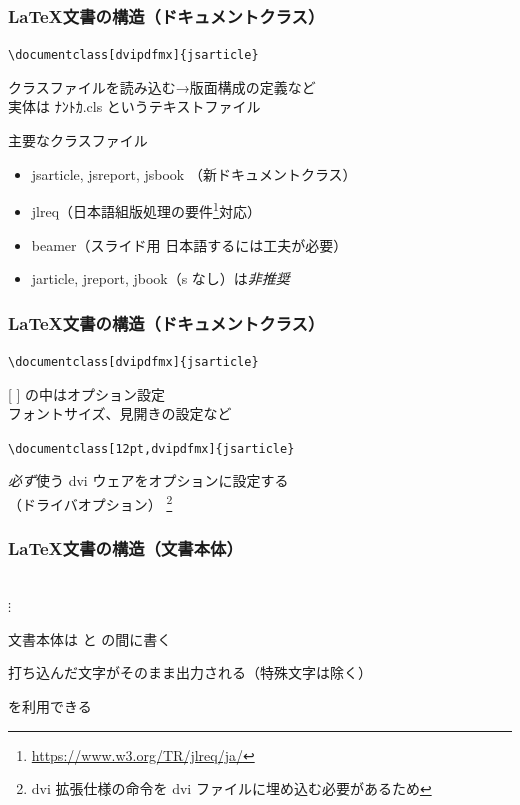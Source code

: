 \begin{frame}[fragile]
	\frametitle{\LaTeX 文書の構造（ドキュメントクラス）}
	\begin{center}
		\verb+\documentclass[dvipdfmx]{jsarticle}+
	\end{center}
	
	クラスファイルを読み込む→版面構成の定義など\\
	{\footnotesize 実体は ﾅﾝﾄｶ.cls というテキストファイル}
	
	\begin{block}{主要なクラスファイル}
		\begin{itemize}
			\footnotesize
			\item jsarticle, jsreport, jsbook （新ドキュメントクラス）\\
			\item jlreq（日本語組版処理の要件\footnote{\url{https://www.w3.org/TR/jlreq/ja/}}対応）\\
			\item beamer（スライド用 日本語するには工夫が必要）
			\item jarticle, jreport, jbook（s なし）は\emph{非推奨}
		\end{itemize}
	\end{block}
\end{frame}

\begin{frame}[fragile]
	\frametitle{\LaTeX 文書の構造（ドキュメントクラス）}
	\begin{center}
		\verb+\documentclass[dvipdfmx]{jsarticle}+
	\end{center}
	
	[ ] の中はオプション設定\\
	\bgroup\footnotesize フォントサイズ、見開きの設定など
	\begin{center}
		\verb+\documentclass[12pt,dvipdfmx]{jsarticle}+
	\end{center}
	\egroup
	
	\emph{必ず}使う dvi ウェアをオプションに設定する\\
	（ドライバオプション）
	\footnote{dvi 拡張仕様の命令を dvi ファイルに埋め込む必要があるため}
\end{frame}

\begin{frame}[fragile]
	\frametitle{\LaTeX 文書の構造（文書本体）}
	\begin{center}
		\verb++\\
		$\vdots$\\
		\verb++
	\end{center}
	
	文書本体は \verb++ と \verb++ の間に書く
	
	打ち込んだ文字がそのまま出力される（特殊文字は除く）
	
	を利用できる
\end{frame}

